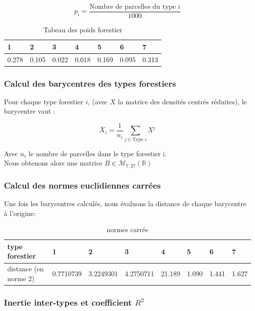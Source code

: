 \documentclass{article}
\begin{document}
\[
p_i = \frac{\text{Nombre de parcelles du type } i}{1000}
\]

\begin{table}[H]
    \center
    \begin{tabular}{|l|l|l|l|l|l|l|}
    \hline
    1     & 2     & 3     & 4     & 5     & 6     & 7     \\ \hline
    0.278 & 0.105 & 0.022 & 0.018 & 0.169 & 0.095 & 0.313 \\ \hline
    \end{tabular}
    \caption{Tabeau des poids forestier}
    \end{table}


\subsubsection{Calcul des barycentres des types forestiers}
Pour chaque type forestier $i$,  (avec $X$ la matrice des densités centrés réduites), le barycentre vaut :

\[
\bar{X}_i = \frac{1}{n_i} \sum_{j \in \text{Type } i} X^j
\]

Avec $n_i$ le nombre de parcelles dans le type forestier i.
\\
Nous obtenons alors une matrice $B \in \mathcal{M}_{7,27}(\mathbb{R})$


\subsubsection{Calcul des normes euclidiennes carrées}
Une fois les barycentres calculés, nous évaluons la distance de chaque barycentre à l'origine:

\begin{table}[H]
    \begin{tabular}{|l|l|l|l|l|l|l|l|}
    \hline
    type forestier       & 1         & 2         & 3         & 4      & 5     & 6     & 7     \\ \hline
    distance (en norme 2) & 0.7710739 & 3.2249301 & 4.2750711 & 21.189 & 1.090 & 1.441 & 1.627 \\ \hline
    \end{tabular}
    \caption{normes carrée}
    \end{table}





\subsubsection{Inertie inter-types et coefficient $R^2$}
\end{document}
